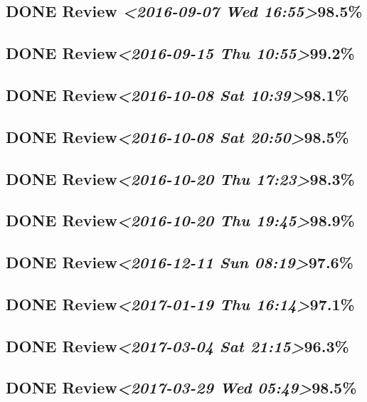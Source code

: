 \documentclass[11pt]{ctexart}
\begin{document}
\subsection{{\bfseries\sffamily DONE} Review \textit{<2016-09-07 Wed 16:55>}98.5\%}
\label{sec:orgc39b76c}
\subsection{{\bfseries\sffamily DONE} Review\textit{<2016-09-15 Thu 10:55>}99.2\%}
\label{sec:org4deebe7}
\subsection{{\bfseries\sffamily DONE} Review\textit{<2016-10-08 Sat 10:39>}98.1\%}
\label{sec:org27a6d97}
\subsection{{\bfseries\sffamily DONE} Review\textit{<2016-10-08 Sat 20:50>}98.5\%}
\label{sec:org8678a18}
\subsection{{\bfseries\sffamily DONE} Review\textit{<2016-10-20 Thu 17:23>}98.3\%}
\label{sec:orgb9b5014}
\subsection{{\bfseries\sffamily DONE} Review\textit{<2016-10-20 Thu 19:45>}98.9\%}
\label{sec:org0b140cb}
\subsection{{\bfseries\sffamily DONE} Review\textit{<2016-12-11 Sun 08:19>}97.6\%}
\label{sec:org93f5905}
\subsection{{\bfseries\sffamily DONE} Review\textit{<2017-01-19 Thu 16:14>}97.1\%}
\label{sec:org893435d}
\subsection{{\bfseries\sffamily DONE} Review\textit{<2017-03-04 Sat 21:15>}96.3\%}
\label{sec:orge76b342}
\subsection{{\bfseries\sffamily DONE} Review\textit{<2017-03-29 Wed 05:49>}98.5\%}
\label{sec:org88c178d}
\end{document}

